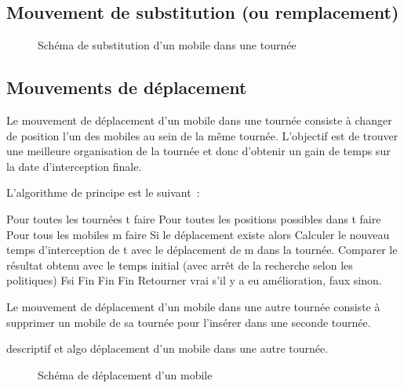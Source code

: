 		\subsection{Mouvement de substitution (ou remplacement)}
			\begin{figure}[h!]
			\centering
			\begin{tikzpicture}[schema]
				
			\end{tikzpicture}
			\caption{Schéma de substitution d'un mobile dans une tournée}
			\label{fig:move_replace}
			\end{figure}

		\subsection{Mouvements de déplacement}
			Le mouvement de déplacement d'un mobile dans une tournée consiste à changer de position l'un des mobiles au sein de la même tournée. L'objectif est de trouver une meilleure organisation de la tournée et donc d'obtenir un gain de temps sur la date d'interception finale.

			L'algorithme de principe est le suivant :

Pour toutes les tournées t faire
	Pour toutes les positions possibles dans t faire
		Pour tous les mobiles m faire
			Si le déplacement existe alors
				Calculer le nouveau temps d'interception de t avec le déplacement de 				m dans la tournée.
				Comparer le résultat obtenu avec le temps initial (avec arrêt de la 					recherche selon les politiques)
			Fsi
		Fin
	Fin
Fin
Retourner vrai s'il y a eu amélioration, faux sinon.

			Le mouvement de déplacement d'un mobile dans une autre tournée consiste à supprimer un mobile de sa tournée pour l'insérer dans une seconde tournée. 

\TODO descriptif et algo déplacement d'un mobile dans une autre tournée.
			
			\begin{figure}[h!]
			\begin{subfigure}[b]{.54\linewidth}
				\centering
				\begin{tikzpicture}[schema]
					
				\end{tikzpicture}
				\label{subfig:move_move1route}
			\end{subfigure}
			\hfill
			\begin{subfigure}[b]{.45\linewidth}
				\centering
				\begin{tikzpicture}[schema]
					
				\end{tikzpicture}
				\label{subfig:move_move2routes}
			\end{subfigure}
			\caption{Schéma de déplacement d'un mobile}
			\label{fig:move_move}
			\end{figure}

